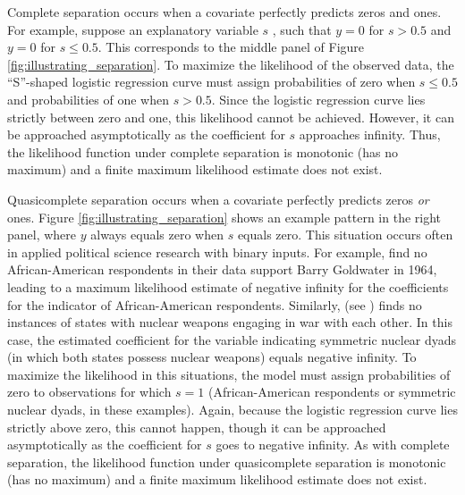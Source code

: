 \documentclass[12pt]{article}
\begin{document}
Complete separation occurs when a covariate perfectly predicts zeros and ones. For example, suppose an explanatory variable $s$ , such that $y = 0$ for $s > 0.5$ and $y = 0$ for $s \leq 0.5$. This corresponds to the middle panel of Figure \ref{fig:illustrating_separation}.  To maximize the likelihood of the observed data, the ``S''-shaped logistic regression curve must assign probabilities of zero when $s \leq 0.5$ and probabilities of one when $s > 0.5$. Since the logistic regression curve lies strictly between zero and one, this likelihood cannot be achieved. However, it can be approached asymptotically as the coefficient for $s$ approaches infinity. Thus, the likelihood function under complete separation is monotonic (has no maximum) and a finite maximum likelihood estimate does not exist.

Quasicomplete separation occurs when a covariate perfectly predicts zeros \textit{or} ones. Figure \ref{fig:illustrating_separation} shows an example pattern in the right panel, where $y$ always equals zero when $s$ equals zero. This situation occurs often in applied political science research with binary inputs. For example, \cite{Gelmanetal2008} find no African-American respondents in their data support Barry Goldwater in 1964, leading to a maximum likelihood estimate of negative infinity for the coefficients for the indicator of African-American respondents. Similarly, \cite{Rauchhaus2009} (see \citealt{BellMiller2014}) finds no instances of states with nuclear weapons engaging in war with each other. In this case, the estimated coefficient for the variable indicating symmetric nuclear dyads (in which both states possess nuclear weapons) equals negative infinity. To maximize the likelihood in this situations, the model must assign probabilities of zero to observations for which $s = 1$ (African-American respondents or symmetric nuclear dyads, in these examples). Again, because the logistic regression curve lies strictly above zero, this cannot happen, though it can be approached asymptotically as the coefficient for $s$ goes to negative infinity. As with complete separation, the likelihood function under quasicomplete separation is monotonic (has no maximum) and a finite maximum likelihood estimate does not exist.
\end{document}
